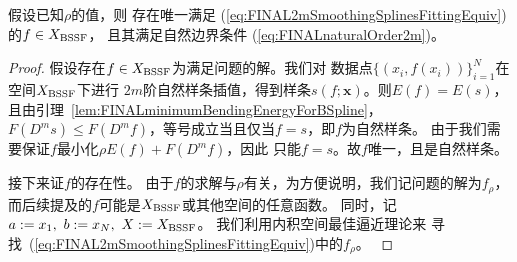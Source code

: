 \begin{thm}
  \label{thm:FINAL2mSmoothingSplinesFitting}
  假设已知$\rho$的值，则
  存在唯一满足 (\ref{eq:FINAL2mSmoothingSplinesFittingEquiv})的$f\in  X_{\textnormal{BSSF}}$，
  且其满足自然边界条件 (\ref{eq:FINALnaturalOrder2m})。
\end{thm}
\begin{proof}
  假设存在$f\in X_{\textnormal{BSSF}}$为满足问题的解。我们对
  数据点$\{(x_{i},f(x_{i}))\}_{i=1}^{N}$在空间$X_{\textnormal{BSSF}}$下进行
  $2m$阶自然样条插值，得到样条$s(f;\mathbf{x})$。则$E(f)=E(s)$，
  且由引理~\ref{lem:FINALminimumBendingEnergyForBSpline}，
  $F(D^{m}s)\le F(D^{m}f)$，等号成立当且仅当$f=s$，即$f$为自然样条。
  由于我们需要保证$f$最小化$\rho E(f)+F(D^{m}f)$，因此
  只能$f=s$。故$f$唯一，且是自然样条。

  接下来证$f$的存在性。
  由于$f$的求解与$\rho$有关，为方便说明，我们记问题的解为$f_{\rho}$，
  而后续提及的$f$可能是$ X_{\textnormal{BSSF}}$或其他空间的任意函数。
  同时，记$a:=x_{1},\ b:=x_{N},\ X:=X_{\textnormal{BSSF}}$。
  我们利用内积空间最佳逼近理论来
  寻找~(\ref{eq:FINAL2mSmoothingSplinesFittingEquiv})中的$f_{\rho}$。
  \cite{Boor2001CALCULATIONOT}


\end{proof}
